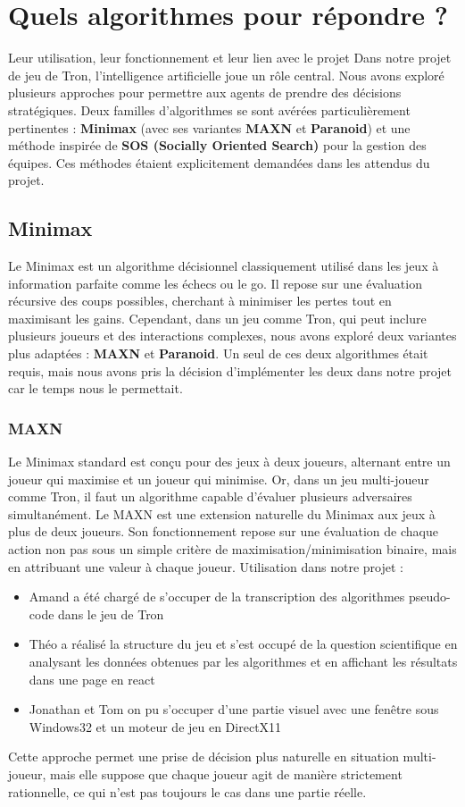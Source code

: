 \section{Quels algorithmes pour répondre ?}
Leur utilisation, leur fonctionnement et leur lien avec le projet
Dans notre projet de jeu de Tron, l'intelligence artificielle joue un rôle central. Nous avons exploré plusieurs approches pour permettre aux agents de prendre des décisions stratégiques. Deux familles d'algorithmes se sont avérées particulièrement pertinentes : \textbf{Minimax} (avec ses variantes \textbf{MAXN} et \textbf{Paranoid}) et une méthode inspirée de \textbf{SOS (Socially Oriented Search)} pour la gestion des équipes. Ces méthodes étaient explicitement demandées dans les attendus du projet.

\subsection{Minimax}
Le Minimax est un algorithme décisionnel classiquement utilisé dans les jeux à information parfaite comme les échecs ou le go. Il repose sur une évaluation récursive des coups possibles, cherchant à minimiser les pertes tout en maximisant les gains. Cependant, dans un jeu comme Tron, qui peut inclure plusieurs joueurs et des interactions complexes, nous avons exploré deux variantes plus adaptées : \textbf{MAXN} et \textbf{Paranoid}.
Un seul de ces deux algorithmes était requis, mais nous avons pris la décision d'implémenter les deux dans notre projet car le temps nous le permettait.

\subsubsection{MAXN}
Le Minimax standard est conçu pour des jeux à deux joueurs, alternant entre un joueur qui maximise et un joueur qui minimise. Or, dans un jeu multi-joueur comme Tron, il faut un algorithme capable d'évaluer plusieurs adversaires simultanément.
Le MAXN est une extension naturelle du Minimax aux jeux à plus de deux joueurs. Son fonctionnement repose sur une évaluation de chaque action non pas sous un simple critère de maximisation/minimisation binaire, mais en attribuant une valeur à chaque joueur.
Utilisation dans notre projet :
\begin{itemize}
    \item Amand a été chargé de s'occuper de la transcription des algorithmes pseudo-code dans le jeu de Tron
    \item Théo a réalisé la structure du jeu et s'est occupé de la question scientifique en analysant les données obtenues par les algorithmes et en affichant les résultats dans une page en react
    \item Jonathan et Tom on pu s'occuper d'une partie visuel avec une fenêtre sous Windows32 et un moteur de jeu en DirectX11
\end{itemize}
Cette approche permet une prise de décision plus naturelle en situation multi-joueur, mais elle suppose que chaque joueur agit de manière strictement rationnelle, ce qui n'est pas toujours le cas dans une partie réelle.


